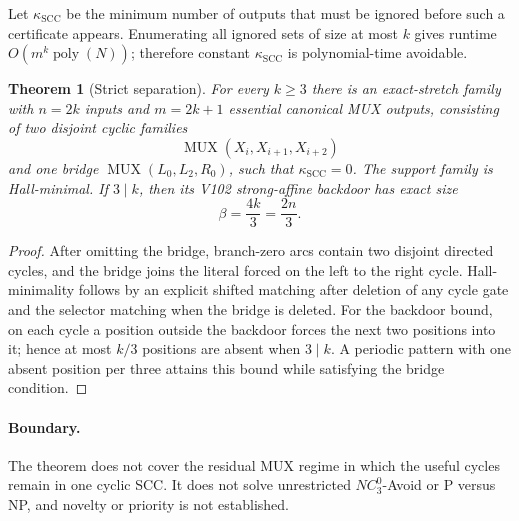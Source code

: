 \documentclass[11pt]{article}
\newtheorem{theorem}{Theorem}
\begin{document}
Let $\kappa_{\mathrm{SCC}}$ be the minimum number of outputs that must be ignored
before such a certificate appears.  Enumerating all ignored sets of size at most
$k$ gives runtime $O(m^k\operatorname{poly}(N))$; therefore constant
$\kappa_{\mathrm{SCC}}$ is polynomial-time avoidable.

\begin{theorem}[Strict separation]
For every $k\ge3$ there is an exact-stretch family with $n=2k$ inputs and
$m=2k+1$ essential canonical MUX outputs, consisting of two disjoint cyclic
families
\[
 \operatorname{MUX}(X_i,X_{i+1},X_{i+2})
\]
and one bridge $\operatorname{MUX}(L_0,L_2,R_0)$, such that
$\kappa_{\mathrm{SCC}}=0$.  The support family is Hall-minimal.  If $3\mid k$,
then its V102 strong-affine backdoor has exact size
\[
 \beta=\frac{4k}{3}=\frac{2n}{3}.
\]
\end{theorem}

\begin{proof}
After omitting the bridge, branch-zero arcs contain two disjoint directed cycles,
and the bridge joins the literal forced on the left to the right cycle.
Hall-minimality follows by an explicit shifted matching after deletion of any
cycle gate and the selector matching when the bridge is deleted.
For the backdoor bound, on each cycle a position outside the backdoor forces the
next two positions into it; hence at most $k/3$ positions are absent when
$3\mid k$.  A periodic pattern with one absent position per three attains this
bound while satisfying the bridge condition.
\end{proof}

\paragraph{Boundary.}
The theorem does not cover the residual MUX regime in which the useful cycles
remain in one cyclic SCC.  It does not solve unrestricted $NC^0_3$-Avoid or
P versus NP, and novelty or priority is not established.
\end{document}
